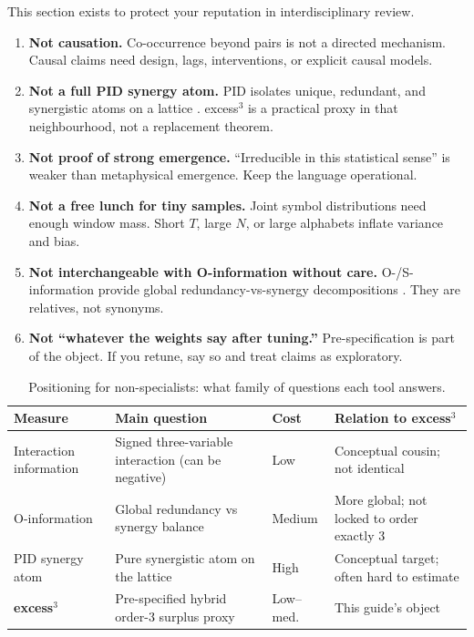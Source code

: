 \documentclass[11pt,a4paper]{article}
\begin{document}
This section exists to protect your reputation in interdisciplinary review.

\begin{enumerate}[leftmargin=*,itemsep=4pt]
  \item \textbf{Not causation.}
  Co-occurrence beyond pairs is not a directed mechanism. Causal claims
  need design, lags, interventions, or explicit causal models.

  \item \textbf{Not a full PID synergy atom.}
  PID isolates unique, redundant, and synergistic atoms on a lattice
  \citep{Williams2010,Bertschinger2014}. excess$^3$ is a practical proxy in
  that neighbourhood, not a replacement theorem.

  \item \textbf{Not proof of strong emergence.}
  ``Irreducible in this statistical sense'' is weaker than metaphysical
  emergence. Keep the language operational.

  \item \textbf{Not a free lunch for tiny samples.}
  Joint symbol distributions need enough window mass. Short $T$, large $N$,
  or large alphabets inflate variance and bias.

  \item \textbf{Not interchangeable with O-information without care.}
  O-/S-information provide global redundancy-vs-synergy decompositions
  \citep{Rosas2019}. They are relatives, not synonyms.

  \item \textbf{Not ``whatever the weights say after tuning.''}
  Pre-specification is part of the object. If you retune, say so and treat
  claims as exploratory.
\end{enumerate}

\begin{table}[H]
\centering
\caption{Positioning for non-specialists: what family of questions each
tool answers.}
\label{tab:position}
\small
\begin{tabularx}{\textwidth}{@{}>{\raggedright\arraybackslash}p{3.0cm}
  >{\raggedright\arraybackslash}X
  >{\raggedright\arraybackslash}p{2.0cm}
  >{\raggedright\arraybackslash}X@{}}
\toprule
\textbf{Measure} & \textbf{Main question} & \textbf{Cost} &
\textbf{Relation to excess$^3$} \\
\midrule
Interaction information
  & Signed three-variable interaction (can be negative)
  & Low
  & Conceptual cousin; not identical \\
O-information
  & Global redundancy vs synergy balance
  & Medium
  & More global; not locked to order exactly 3 \\
PID synergy atom
  & Pure synergistic atom on the lattice
  & High
  & Conceptual target; often hard to estimate \\
\textbf{excess$^3$}
  & Pre-specified hybrid order-3 surplus proxy
  & Low--med.
  & This guide's object \\
\bottomrule
\end{tabularx}
\end{table}
\end{document}

